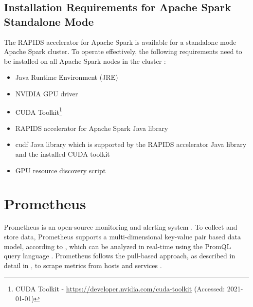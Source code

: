 \subsection{Installation Requirements for Apache Spark Standalone Mode}
\label{subsec:04_rapids_req}
The RAPIDS accelerator for Apache Spark is available for a standalone mode Apache Spark cluster. To operate effectively, the following requirements need to be installed on all Apache Spark nodes in the cluster \cite{SparkRapids2020Docs}:
\begin{itemize}
\item Java Runtime Environment (JRE)
\item NVIDIA GPU driver
\item CUDA Toolkit\footnote{CUDA Toolkit - \url{https://developer.nvidia.com/cuda-toolkit} (Accessed: 2021-01-01)}
\item RAPIDS accelerator for Apache Spark Java library
\item cudf Java library which is supported by the RAPIDS accelerator Java library and the installed CUDA toolkit
\item GPU resource discovery script
\end{itemize}


\section{Prometheus}
\label{sec:04_prom}
Prometheus is an open-source monitoring and alerting system \cite{Prom2020Docs}.
To collect and store data, Prometheus supports a multi-dimensional key-value pair based data model, according to , which can be analyzed in real-time using the PromQL query language \cite{Pandey2020Monitoring}.
Prometheus follows the pull-based approach, as described in detail in , to scrape metrics from hosts and services \cite{Bastos2019Prom}.



